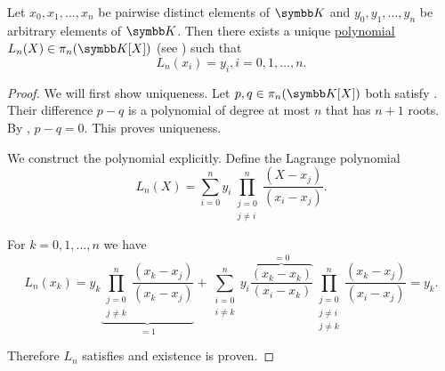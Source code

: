 \begin{Theorem}\label{thm:lagrange_interpolation}
  Let \( x_0, x_1, \ldots, x_n \) be pairwise distinct elements of \( \BK \) and \( y_0, y_1, \ldots, y_n \) be arbitrary elements of \( \BK \). Then there exists a unique \hyperref[def:polynomial]{polynomial} \( L_n(X) \in \pi_n(\BK[X]) \) (see ) such that
  \begin{equation}\label{thm:lagrange_interpolation/condition}
    L_n(x_i) = y_i, i = 0, 1, \ldots, n.
  \end{equation}
\end{Theorem}
\begin{proof}
  We will first show uniqueness. Let \( p, q \in \pi_n(\BK[X]) \) both satisfy . Their difference \( p - q \) is a polynomial of degree at most \( n \) that has \( n + 1 \) roots. By , \( p - q = 0 \). This proves uniqueness.

  We construct the polynomial explicitly. Define the Lagrange polynomial
  \begin{equation*}
    L_n(X) = \sum_{i=0}^n y_i \prod_{\substack{j = 0 \\ j \neq i}}^n \frac {(X - x_j)} {(x_i - x_j)}.
  \end{equation*}

  For \( k = 0, 1, \ldots, n \) we have
  \begin{equation*}
    L_n(x_k) = y_k \underbrace{\prod_{\substack{j = 0 \\ j \neq k}}^n \frac {(x_k - x_j)} {(x_k - x_j)}}_{=1} + \sum_{\substack{i = 0 \\ i \neq k}}^n y_i \overbrace{\frac{(x_k - x_k)}{(x_i - x_k)}}^{=0} \prod_{\substack{j = 0 \\ j \neq i \\ j \neq k}}^n \frac {(x_k - x_j)} {(x_i - x_j)} = y_k.
  \end{equation*}

  Therefore \( L_n \) satisfies  and existence is proven.
\end{proof}
